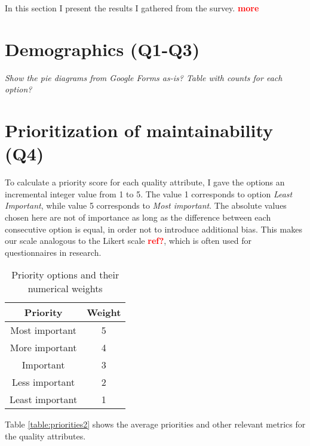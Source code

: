 \documentclass[utf8,english]{gradu3}
\newcommand{\todo}[1]{\textbf{\textcolor{red}{#1}}}
\newcommand{\tmp}[1]{\textit{{#1}}}
\begin{document}
In this section I present the results I gathered from the survey. \todo{more}

\section{Demographics (Q1-Q3)}

\tmp{
  Show the pie diagrams from Google Forms as-is? Table with counts for each option?
}

\section{Prioritization of maintainability (Q4)}

To calculate a priority score for each quality attribute, I gave the options an incremental integer value from 1 to 5.
The value 1 corresponds to option \textit{Least Important}, while value 5 corresponds to \textit{Most important}.
The absolute values chosen here are not of importance as long as the difference between each consecutive option is equal,
in order not to introduce additional bias.
This makes our scale analogous to the Likert scale \todo{ref?}, which is often used for questionnaires in research.


\begin{table}[!h]
  \begin{center}
    \caption{Priority options and their numerical weights}
    \label{table:priorities1}
    \begin{tabular}{|c|c|}
      \hline
      \textbf{Priority} & \textbf{Weight} \\
      \hline
      Most important    & 5               \\
      More important    & 4               \\
      Important         & 3               \\
      Less important    & 2               \\
      Least important   & 1               \\
      \hline
    \end{tabular}
  \end{center}
\end{table}

Table \ref{table:priorities2} shows the average priorities and other relevant metrics for the quality attributes.
\end{document}
